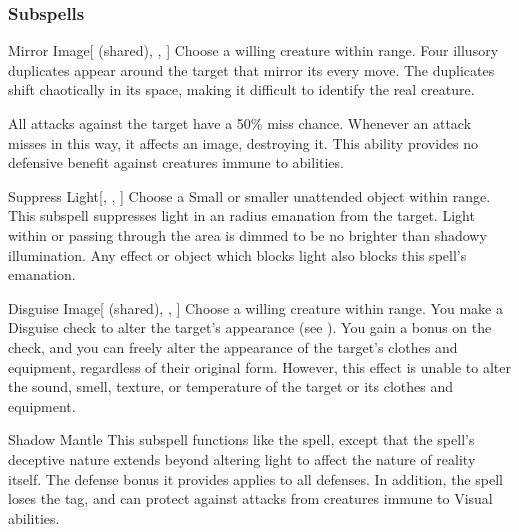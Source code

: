 \subsubsection{Subspells}


\begin{ability}[\nth{2}]{Mirror Image}[ (shared), , ]
Choose a willing creature within \rngclose range.
Four illusory duplicates appear around the target that mirror its every move.
The duplicates shift chaotically in its space, making it difficult to identify the real creature.

All  attacks against the target have a 50\% miss chance.
Whenever an attack misses in this way, it affects an image, destroying it.
This ability provides no defensive benefit against creatures immune to  abilities.
\end{ability}
\vspace{0.25em}


\begin{ability}[\nth{2}]{Suppress Light}[, , ]
Choose a Small or smaller unattended object within \rngclose range.
This subspell suppresses light in an \areamed radius emanation from the target.
Light within or passing through the area is dimmed to be no brighter than shadowy illumination.
Any effect or object which blocks light also blocks this spell's emanation.
\end{ability}
\vspace{0.25em}


\begin{ability}[\nth{3}]{Disguise Image}[ (shared), , ]
Choose a willing creature within \rngclose range.
You make a Disguise check to alter the target's appearance (see ).
You gain a  bonus on the check, and you can freely alter the appearance of the target's clothes and equipment, regardless of their original form.
However, this effect is unable to alter the sound, smell, texture, or temperature of the target or its clothes and equipment.
\end{ability}
\vspace{0.25em}


\begin{ability}[\nth{4}]{Shadow Mantle}
This subspell functions like the  spell, except that the spell's deceptive nature extends beyond altering light to affect the nature of reality itself.
The defense bonus it provides applies to all defenses.
In addition, the spell loses the  tag, and can protect against attacks from creatures immune to Visual abilities.
\end{ability}
\vspace{0.25em}


